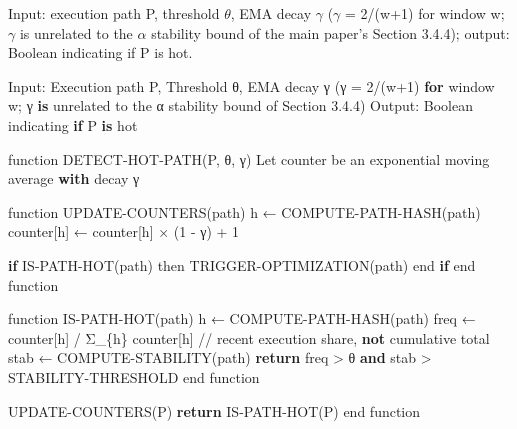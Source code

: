 \documentclass[
  11pt,
]{article}
\newenvironment{Shaded}{}{}
\newcommand{\ControlFlowTok}[1]{\textcolor[rgb]{0.00,0.44,0.13}{\textbf{#1}}}
\newcommand{\DecValTok}[1]{\textcolor[rgb]{0.25,0.63,0.44}{#1}}
\newcommand{\FloatTok}[1]{\textcolor[rgb]{0.25,0.63,0.44}{#1}}
\newcommand{\KeywordTok}[1]{\textcolor[rgb]{0.00,0.44,0.13}{\textbf{#1}}}
\newcommand{\NormalTok}[1]{#1}
\newcommand{\OperatorTok}[1]{\textcolor[rgb]{0.40,0.40,0.40}{#1}}
\newcommand{\StringTok}[1]{\textcolor[rgb]{0.25,0.44,0.63}{#1}}
\begin{document}
Input: execution path P, threshold \(\theta\), EMA decay \(\gamma\)
(\(\gamma\) = 2/(w+1) for window w; \(\gamma\) is unrelated to the
\(\alpha\) stability bound of the main paper's Section 3.4.4); output:
Boolean indicating if P is hot.

\begin{Shaded}
\begin{Highlighting}[]
\NormalTok{Input: Execution path P, Threshold θ, EMA decay γ (γ }\OperatorTok{=} \DecValTok{2}\OperatorTok{/}\NormalTok{(w}\OperatorTok{+}\DecValTok{1}\NormalTok{) }\ControlFlowTok{for}\NormalTok{ window w}\OperatorTok{;}\NormalTok{ γ }\KeywordTok{is}\NormalTok{ unrelated to the α stability bound of Section }\FloatTok{3.4.4}\NormalTok{)}
\NormalTok{Output: Boolean indicating }\ControlFlowTok{if}\NormalTok{ P }\KeywordTok{is}\NormalTok{ hot}

\NormalTok{function DETECT}\OperatorTok{{-}}\NormalTok{HOT}\OperatorTok{{-}}\NormalTok{PATH(P, θ, γ)}
\NormalTok{    Let counter be an exponential moving average }\ControlFlowTok{with}\NormalTok{ decay γ}
    
\NormalTok{    function UPDATE}\OperatorTok{{-}}\NormalTok{COUNTERS(path)}
\NormalTok{        h ← COMPUTE}\OperatorTok{{-}}\NormalTok{PATH}\OperatorTok{{-}}\NormalTok{HASH(path)}
\NormalTok{        counter[h] ← counter[h] × (}\DecValTok{1} \OperatorTok{{-}}\NormalTok{ γ) }\OperatorTok{+} \DecValTok{1}
        
        \ControlFlowTok{if}\NormalTok{ IS}\OperatorTok{{-}}\NormalTok{PATH}\OperatorTok{{-}}\NormalTok{HOT(path) then}
\NormalTok{            TRIGGER}\OperatorTok{{-}}\NormalTok{OPTIMIZATION(path)}
\NormalTok{        end }\ControlFlowTok{if}
\NormalTok{    end function}
    
\NormalTok{    function IS}\OperatorTok{{-}}\NormalTok{PATH}\OperatorTok{{-}}\NormalTok{HOT(path)}
\NormalTok{        h ← COMPUTE}\OperatorTok{{-}}\NormalTok{PATH}\OperatorTok{{-}}\NormalTok{HASH(path)}
\NormalTok{        freq ← counter[h] }\OperatorTok{/}\NormalTok{ Σ\_\{h}\StringTok{\textquotesingle{}\} counter[h\textquotesingle{}}\NormalTok{]   }\OperatorTok{//}\NormalTok{ recent execution share, }\KeywordTok{not}\NormalTok{ cumulative total}
\NormalTok{        stab ← COMPUTE}\OperatorTok{{-}}\NormalTok{STABILITY(path)}
        \ControlFlowTok{return}\NormalTok{ freq }\OperatorTok{\textgreater{}}\NormalTok{ θ }\KeywordTok{and}\NormalTok{ stab }\OperatorTok{\textgreater{}}\NormalTok{ STABILITY}\OperatorTok{{-}}\NormalTok{THRESHOLD}
\NormalTok{    end function}
    
\NormalTok{    UPDATE}\OperatorTok{{-}}\NormalTok{COUNTERS(P)}
    \ControlFlowTok{return}\NormalTok{ IS}\OperatorTok{{-}}\NormalTok{PATH}\OperatorTok{{-}}\NormalTok{HOT(P)}
\NormalTok{end function}
\end{Highlighting}
\end{Shaded}
\end{document}
